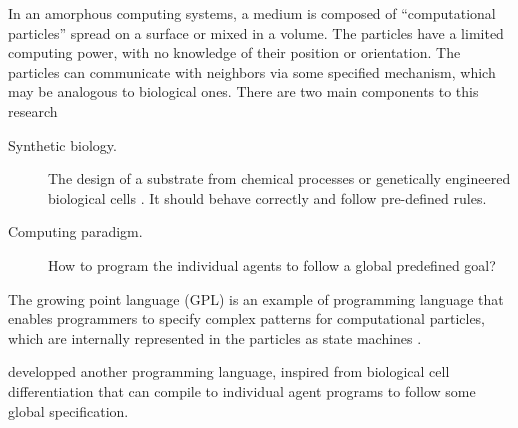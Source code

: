 In an amorphous computing systems, a medium is composed of ``computational
particles'' spread on a surface or mixed in a volume. The particles have a
limited computing power, with no knowledge of their position or orientation. The
particles can communicate with neighbors via some specified mechanism, which may
be analogous to biological ones. There are two main components to this research
\begin{description}
  \item[Synthetic biology.] The design of a substrate from chemical processes or
        genetically engineered biological cells
        \parencite{weissVivoDigitalCircuits2002}. It should behave correctly and
        follow pre-defined rules.
  \item[Computing paradigm.] How to program the individual agents to follow a
        global predefined goal?
        \parencite{nagpalProgrammableSelfassemblyConstructing2001}
\end{description}


The growing point language (GPL) is an example of programming language that
enables programmers to specify complex patterns for computational particles,
which are internally represented in the particles as state machines
\parencite{cooreBotanicalComputingDevelopmental1999}.

\textcite{nagpalProgrammableSelfassemblyUsing2002} developped another
programming language, inspired from biological cell differentiation
\parencite{lawrenceMakingFlyGenetics1992,
  wolpertPositionalInformationSpatial1969} that can compile to individual agent
programs to follow some global specification.
